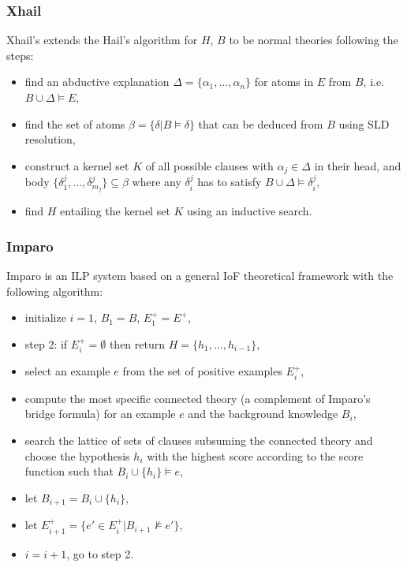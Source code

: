 \subsubsection{Xhail\cite{kimber2012learning}\cite{ray2005phdHybrid}}
Xhail's extends the Hail's algorithm for $H$, $B$ to be normal theories following the steps:
\begin{itemize}
\item find an abductive explanation $\Delta=\{\alpha_1, ..., \alpha_n\}$ for atoms in $E$ from $B$, i.e. $B \cup \Delta \models E$,
\item find the set of atoms $\beta=\{\delta | B \models \delta\}$ that can be deduced from $B$ using SLD resolution,
\item construct a kernel set $K$ of all possible clauses with $\alpha_j \in \Delta$ in their head, and body $\{\delta^j_1, ..., \delta^j_{m_j}\} \subseteq \beta$ where any $\delta^j_i$ has to satisfy $B \cup \Delta \models \delta^j_i$,
\item find $H$ entailing the kernel set $K$ using an inductive search.
\end{itemize}

\subsubsection{Imparo}
Imparo is an ILP system based on a general IoF theoretical framework with the following algorithm:
\begin{itemize}
\item initialize $i=1$, $B_1=B$, $E^+_1=E^+$,
\item step 2: if $E^+_i = \emptyset$ then return $H=\{h_1, ..., h_{i-1}\}$,
\item select an example $e$ from the set of positive examples $E^+_i$,
\item compute the most specific connected theory (a complement of Imparo's bridge formula) for an example $e$ and the background knowledge $B_i$,
\item search the lattice of sets of clauses subsuming the connected theory and choose the hypothesis $h_i$ with the highest score according to the score function such that $B_i \cup \{h_i\} \models e$,
\item let $B_{i+1}=B_i \cup \{h_i\}$,
\item let $E^+_{i+1}=\{e' \in E^+_i | B_{i+1} \not\models e'\}$,
\item $i=i+1$, go to step 2.
\end{itemize}

